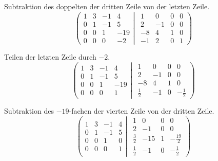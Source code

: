 \documentclass[a4paper,german,12pt,smallheadings]{scrartcl}
\begin{document}
Subtraktion des doppelten der dritten Zeile von der letzten Zeile.
\begin{equation*}
\left(
 \begin{matrix}
 1 & 3 & -1 & 4 \\
 0 & 1 & -1 & 5 \\
 0 & 0 & 1 & -19 \\
 0 & 0 & 0 & -2
 \end{matrix}
 \left|
  \hspace{5pt}
  \begin{matrix}
  1 & 0 & 0 & 0 \\
  2 & -1 & 0 & 0 \\
  -8 & 4 & 1 & 0 \\
  -1 & 2 & 0 & 1
  \end{matrix}
 \right)
\right.
\end{equation*}

Teilen der letzten Zeile durch $-2$.
\begin{equation*}
\left(
 \begin{matrix}
 1 & 3 & -1 & 4 \\
 0 & 1 & -1 & 5 \\
 0 & 0 & 1 & -19 \\
 0 & 0 & 0 & 1
 \end{matrix}
 \left|
  \hspace{5pt}
  \begin{matrix}
  1 & 0 & 0 & 0 \\
  2 & -1 & 0 & 0 \\
  -8 & 4 & 1 & 0 \\
  \frac{1}{2} & -1 & 0 & -\frac{1}{2}
  \end{matrix}
 \right)
\right.
\end{equation*}

Subtraktion des $-19$-fachen der vierten Zeile von der dritten Zeile.
\begin{equation*}
\left(
 \begin{matrix}
 1 & 3 & -1 & 4 \\
 0 & 1 & -1 & 5 \\
 0 & 0 & 1 & 0 \\
 0 & 0 & 0 & 1
 \end{matrix}
 \left|
  \hspace{5pt}
  \begin{matrix}
  1 & 0 & 0 & 0 \\
  2 & -1 & 0 & 0 \\
  \frac{3}{2} & -15 & 1 & -\frac{19}{2} \\
  \frac{1}{2} & -1 & 0 & -\frac{1}{2}
  \end{matrix}
 \right)
\right.
\end{equation*}
\end{document}

